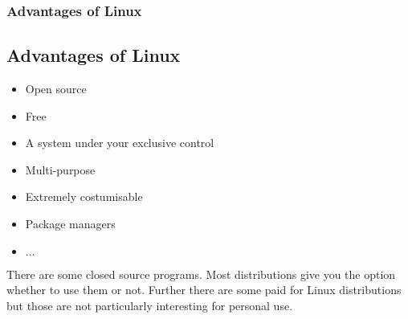 \begin{frame}
	\frametitle{Advantages of Linux}
	\subsection{Advantages of Linux}
	
	\begin{itemize}
		\item Open source
		\item Free
		\item A system under your exclusive control
		\item Multi-purpose
		\item Extremely costumisable
		\item Package managers
		\item $\dots$
	\end{itemize}

	\vfill
	
	There are some closed source programs. Most distributions give you the option whether to use them or not. Further there are some paid for Linux distributions but those are not particularly interesting for personal use.
\end{frame}
